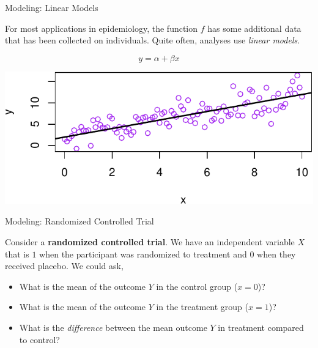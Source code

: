 \documentclass[ignorenonframetext,]{beamer}
\providecommand{\tightlist}{%
  \setlength{\itemsep}{0pt}\setlength{\parskip}{0pt}}
\begin{document}
\begin{frame}{Modeling: Linear Models}
\protect\hypertarget{modeling-linear-models}{}

For most applications in epidemiology, the function \(f\) has some
additional data that has been collected on individuals. Quite often,
analyses use \emph{linear models}.

\[
y = \alpha + \beta x
\]

\includegraphics{biostats_I_files/figure-beamer/unnamed-chunk-1-1.pdf}

\end{frame}

\begin{frame}{Modeling: Randomized Controlled Trial}
\protect\hypertarget{modeling-randomized-controlled-trial}{}

Consider a \textbf{randomized controlled trial}. We have an independent
variable \(X\) that is \(1\) when the participant was randomized to
treatment and \(0\) when they received placebo. We could ask,

\begin{itemize}
\tightlist
\item
  What is the mean of the outcome \(Y\) in the control group
  (\(x = 0\))?
\item
  What is the mean of the outcome \(Y\) in the treatment group
  (\(x = 1\))?
\item
  What is the \emph{difference} between the mean outcome \(Y\) in
  treatment compared to control?
\end{itemize}

\end{frame}
\end{document}
